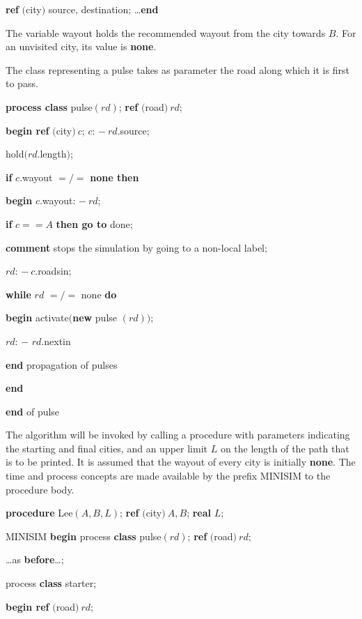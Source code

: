 \documentclass[twoside,11pt]{book}
\begin{document}
\quad \quad \textbf{ref} $($city$)$ source, destination; \dots \textbf{end}

\noindent
The variable wayout holds the recommended wayout from the city towards $B$. For an unvisited city, its value is \textbf{none}.

The class representing a pulse takes as parameter the road along which it is first to pass.

\quad \textbf{process class} pulse$(rd)$; \textbf{ref} $($road$)\ rd$;

\quad \textbf{begin ref} $($city$)\ c$; $c$: $-\ rd$.source;

\quad \quad hold$(rd$.length$)$;

\quad \quad \textbf{if} $c$.wayout $=/=$ \textbf{none then}

\quad \quad \textbf{begin} $c$.wayout: $-\ rd$;

\quad \quad \quad \textbf{if} $c == A$ \textbf{then go to} done;

\quad \quad \quad \textbf{comment} stops the simulation by going to a non-local label;

\quad \quad \quad $rd$: $-\ c$.roadsin;

\quad \quad \quad \textbf{while} $rd$ $=/=$ none \textbf{do}

\quad \quad \quad \textbf{begin} activate$($\textbf{new} pulse $(rd));$

\quad \quad \quad \quad $rd$: $-$ $rd$.nextin

\quad \quad \quad \textbf{end} propagation of pulses

\quad \quad \textbf{end}

\quad \textbf{end} of pulse

The algorithm will be invoked by calling a procedure with parameters indicating the starting and final cities, and an upper limit $L$ on the length of the path that is to be printed. It is assumed that the wayout of every city is initially \textbf{none}. The time and process concepts are made available by the prefix MINISIM to the procedure body.

\quad \textbf{procedure} Lee$(A, B, L)$; \textbf{ref} $($city$)\ A, B$; \textbf{real} $L$;

\quad \quad MINISIM \textbf{begin} process \textbf{class} pulse$(rd)$; \textbf{ref} $($road$)\ rd$;

\quad \quad \quad \dots as \textbf{before}\dots;

\quad \quad \quad process \textbf{class} starter;

\quad \quad \quad \quad \textbf{begin ref} $($road$)\ rd$;
\end{document}
